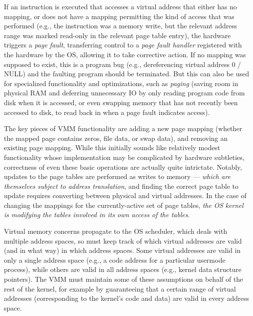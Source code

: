 If an instruction is executed that accesses a virtual address that either has no mapping, or does not have a mapping permitting 
the kind of access that was performed (e.g., the instruction was a memory write, but the relevant address range was marked read-only in
the relevant page table entry), the hardware triggers a \emph{page fault}, transferring control to a \emph{page fault handler} registered 
with the hardware by the OS, allowing it to take corrective action.
If no mapping was supposed to exist, this is a program bug (e.g., dereferencing virtual address 0 / NULL)
and the faulting program should be terminated. But this can also be used for
specialized functionality and optimizations, such as \emph{paging} (saving room in physical RAM and deferring
unnecessary IO by only reading program code from disk when it is accessed, or even swapping memory that has not
recently been accessed to disk, to read back in when a page fault indicates access).

The key pieces of VMM functionality are
adding a new page mapping (whether the mapped page contains zeros, file data, or swap data), and removing an existing 
page mapping.
While this initially sounds like relatively modest functionality whose implementation may be complicated by hardware 
subtleties, correctness of even these basic operations are actually quite intrictate.
Notably, updates to the page tables are performed as writes to memory --- \emph{which are themselves subject to address translation},
and finding the correct page table to update requires converting between physical and virtual addresses.
In the case of changing the mappings for the currently-active set of page tables, 
\emph{the OS kernel is modifying the tables involved in its
own access of the tables}.

Virtual memory concerns propagate to the OS scheduler, which deals with multiple 
address spaces, so must keep track of which virtual addresses are valid (and in what way) in which address spaces. 
Some virtual addresses are valid in only a single address space (e.g., a code address for a particular usermode 
process), while others are valid in all address spaces (e.g., kernel data structure pointers). 
The VMM must maintain some of these assumptions on behalf of the rest of the kernel, for example by guaranteeing that 
a certain range of virtual addresses (corresponding to the kernel's code and data) are valid in every address space.


